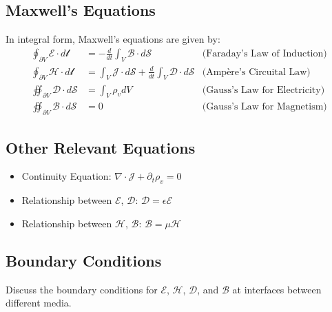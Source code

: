 \documentclass[12pt]{article}
\begin{document}
\subsection*{Maxwell's Equations}
In integral form, Maxwell's equations are given by:
\begin{align}
  \oint_{\partial V} \bm{\mathcal{E}} \cdot d\bm{\mathcal{l}} &= - \frac{d}{dt} \int_{V} \bm{\mathcal{B}} \cdot d\bm{\mathcal{S}} & \text{(Faraday's Law of Induction)} \\
  \oint_{\partial V} \bm{\mathcal{H}} \cdot d\bm{\mathcal{l}} &= \int_{V} \bm{\mathcal{J}} \cdot d\bm{\mathcal{S}} + \frac{d}{dt} \int_{V} \bm{\mathcal{D}} \cdot d\bm{\mathcal{S}} & \text{(Ampère's Circuital Law)} \\
  \oiint_{\partial V} \bm{\mathcal{D}} \cdot d\bm{\mathcal{S}} &= \int_{V} \rho_v dV & \text{(Gauss's Law for Electricity)} \\
  \oiint_{\partial V} \bm{\mathcal{B}} \cdot d\bm{\mathcal{S}} &= 0 & \text{(Gauss's Law for Magnetism)}
\end{align}

\subsection*{Other Relevant Equations}
\begin{itemize}
  \item Continuity Equation: $\nabla \cdot \bm{\mathcal{J}} + \partial_t \rho_v = 0$
  \item Relationship between $\bm{\mathcal{E}}$, $\bm{\mathcal{D}}$: $\bm{\mathcal{D}} = \epsilon \bm{\mathcal{E}}$
  \item Relationship between $\bm{\mathcal{H}}$, $\bm{\mathcal{B}}$: $\bm{\mathcal{B}} = \mu \bm{\mathcal{H}}$
\end{itemize}

\subsection*{Boundary Conditions}
Discuss the boundary conditions for $\bm{\mathcal{E}}$, $\bm{\mathcal{H}}$, $\bm{\mathcal{D}}$, and $\bm{\mathcal{B}}$ at interfaces between different media.
\end{document}
